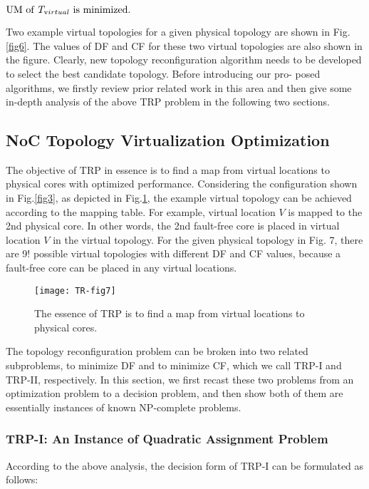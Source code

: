      \begin{center}
         $\mathrm{UM\ of}\ T_{\text virtual}\ \mathrm{is\ minimized.} $ \\
     \end{center}

Two example virtual topologies for a given physical topology are shown in Fig.\ref{fig6}. The values of DF and CF for these two virtual topologies are also shown in the figure. Clearly, new topology reconfiguration algorithm needs to be developed to select the best candidate topology. Before introducing our pro- posed algorithms, we firstly review prior related work in this area and then give some in-depth analysis of the above TRP problem in the following two sections.

\subsection{NoC Topology Virtualization Optimization}
The objective of TRP in essence is to find a map from virtual locations to physical cores with optimized performance. Considering the configuration shown in Fig.\ref{fig3}, as depicted in Fig.\ref{fig7}, the example virtual topology can be achieved according to the mapping table. For example, virtual location $V$ is mapped to the 2nd physical core. In other words, the 2nd fault-free core is placed in virtual location $V$ in the virtual topology. For the given physical topology in Fig. 7, there are 9! possible virtual topologies with different DF and CF values, because a fault-free core can be placed in any virtual locations.

\begin{figure}[t]
    \centering
        \texttt{[image: TR-fig7]}
          \caption{ The essence of TRP is to find a map from virtual locations to physical cores.}
             \label{fig7}
\end{figure}

The topology reconfiguration problem can be broken into two related subproblems, to minimize DF and to minimize CF, which we call TRP-I and TRP-II, respectively. In this section, we first recast these two problems from an optimization problem to a decision problem, and then show both of them are essentially instances of known NP-complete problems.

\subsubsection{TRP-I: An Instance of Quadratic Assignment Problem}
According to the above analysis, the decision form of TRP-I can be formulated as follows:

